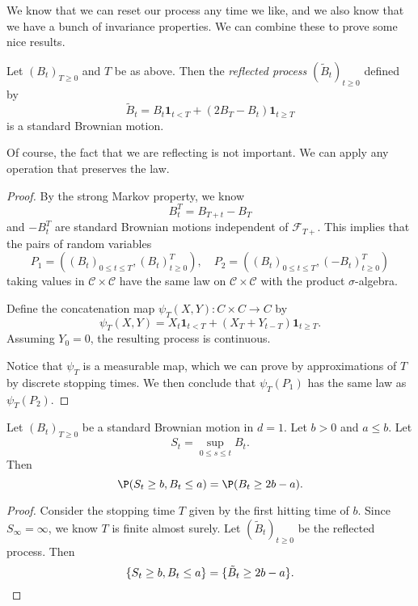 \documentclass[a4paper]{article}
\begin{document}
We know that we can reset our process any time we like, and we also know that we have a bunch of invariance properties. We can combine these to prove some nice results.

\begin{thm}
  Let $(B_t)_{T \geq 0}$ and $T$ be as above. Then the \emph{reflected process} $(\tilde{B}_t)_{t \geq 0}$ defined by
  \[
    \tilde{B}_t = B_t \mathbf{1}_{t < T} + (2 B_T - B_t)\mathbf{1}_{t \geq T}
  \]
  is a standard Brownian motion.
\end{thm}
Of course, the fact that we are reflecting is not important. We can apply any operation that preserves the law.

\begin{proof}
  By the strong Markov property, we know
  \[
    B^T_t = B_{T + t} - B_T
  \]
  and $-B_t^T$ are standard Brownian motions independent of $\mathcal{F}_{T+}$. This implies that the pairs of random variables
  \[
    P_1 = ((B_t)_{0 \leq t \leq T}, (B_t)^T_{t \geq 0}),\quad P_2 = ((B_t)_{0 \leq t \leq T}, (-B_t)^T_{t \geq 0})
  \]
  taking values in $\mathcal{C} \times \mathcal{C}$ have the same law on $\mathcal{C} \times \mathcal{C}$ with the product $\sigma$-algebra.

  Define the concatenation map $\psi_T(X, Y): C \times C \to C$ by
  \[
    \psi_T(X, Y) = X_t \mathbf{1}_{t < T} + (X_T + Y_{t - T}) \mathbf{1}_{t \geq T}.
  \]
  Assuming $Y_0 = 0$, the resulting process is continuous.

  Notice that $\psi_T$ is a measurable map, which we can prove by approximations of $T$ by discrete stopping times. We then conclude that $\psi_T(P_1)$ has the same law as $\psi_T(P_2)$.
\end{proof}

\begin{cor}
  Let $(B_t)_{T \geq 0}$ be a standard Brownian motion in $d = 1$. Let $b > 0$ and $a \leq b$. Let
  \[
    S_t = \sup_{0 \leq s \leq t} B_t.
  \]
  Then
  \[
    \P(S_t \geq b, B_t \leq a) = \P(B_t \geq 2b - a).
  \]
\end{cor}

\begin{proof}
  Consider the stopping time $T$ given by the first hitting time of $b$. Since $S_\infty = \infty$, we know $T$ is finite almost surely. Let $(\tilde{B}_t)_{t\geq 0}$ be the reflected process. Then
  \[
    \{S_t \geq b, B_t \leq a\} = \{\tilde{B}_t  \geq 2b - a \}.\qedhere
  \]
\end{proof}
\end{document}
